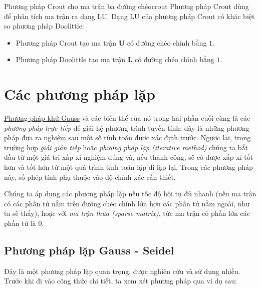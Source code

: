 \documentclass[../../Lectures]{subfiles}
\begin{document}
\begin{cmethod}{Phương pháp Crout cho ma trận ba đường chéo}{crout}
    Phương pháp Crout dùng để phân tích ma trận ra dạng LU. Dạng LU của phương
    pháp Crout có khác biệt so phương pháp Doolittle:
    \begin{itemize}
        \item Phương pháp Crout tạo ma trận \(\bm{U}\) có đường chéo chính bằng
            \(1\).
        \item Phương pháp Doolittle tạo ma trận \(\bm{L}\) có đường chéo chính
            bằng \(1\).
    \end{itemize}
\end{cmethod}



\section{Các phương pháp lặp}

\hyperref[method:gauss_elimination]{Phương pháp khử Gauss} và các biến thể của
nó trong hai phần cuối cùng là các \emph{phương pháp trực tiếp} để giải hệ
phương trình tuyến tính; đây là những phương pháp đưa ra nghiệm sau một số tính
toán được xác định trước. Ngược lại, trong trường hợp \emph{giải gián tiếp} hoặc
\emph{phương pháp lặp (iterative method)} chúng ta bắt đầu từ một giá trị xấp xỉ
nghiệm đúng và, nếu thành công, sẽ có được xấp xỉ tốt hơn và tốt hơn từ một quá
trình tính toán lặp đi lặp lại. Trong các phương pháp này, số phép tính phụ
thuộc vào độ chính xác cần thiết.

Chúng ta áp dụng các phương pháp lặp nếu tốc độ hội tụ đủ nhanh (nếu ma trận có
các phần tử nằm trên đường chéo chính lớn hơn các phần tử nằm ngoài, như ta sẽ
thấy), hoặc với \emph{ma trận thưa (sparse matrix)}, tức ma trận có phần lớn các
phần tử là \(0\).

\subsection{Phương pháp lặp Gauss - Seidel}

Đây là một phương pháp lặp quan trọng, được nghiên cứu và sử dụng nhiều. Trước
khi đi vào công thức chi tiết, ta xem xét phương pháp qua ví dụ sau:
\end{document}

